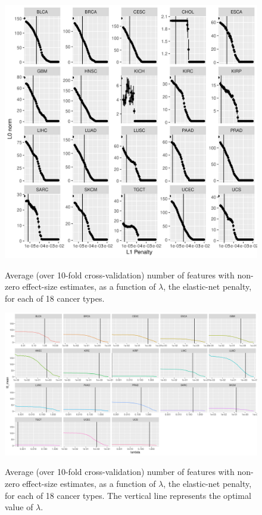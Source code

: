 \begin{figure}
    \centering
    \includegraphics[width=.9\linewidth]{img/cv_l0.png}
    \label{fig:cv_l0}
    \caption{Average (over 10-fold cross-validation) number of features with non-zero effect-size estimates, as a function of $\lambda$, the elastic-net penalty, for each of 18 cancer types.}
\end{figure}



\begin{figure}
    \centering
    \includegraphics[width=.9\linewidth]{img/enet_cv_l0.png}
    \label{fig:enet_cv_l0}
    \caption{Average (over 10-fold cross-validation) number of features with non-zero effect-size estimates, as a function of $\lambda$, the elastic-net penalty, for each of 18 cancer types.  The vertical line
    represents the optimal value of $\lambda$.}
\end{figure}

 
 

% 

